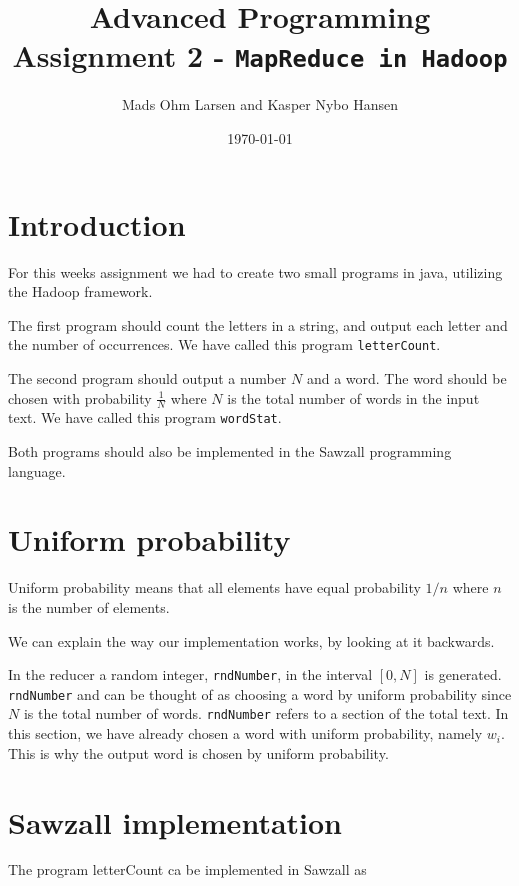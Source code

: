 \documentclass[10pt, a4paper]{article}
\title{Advanced Programming \\\small{Assignment 2} - \texttt{MapReduce in Hadoop}}
\author{Mads Ohm Larsen and Kasper Nybo Hansen}
\date{\today}
\begin{document}
	
\maketitle

\section{Introduction} %
\label{sec:introduction}
For this weeks assignment we had to create two small programs in java, utilizing the Hadoop framework. 

The first program should count the letters in a string, and output each letter and the number of occurrences. We have called this program \texttt{letterCount}.


The second program should output a number $N$ and a word. The word should be chosen with probability $\frac{1}{N}$ where $N$ is the total number of words in the input text. We have called this program \texttt{wordStat}.

Both programs should also be implemented in the Sawzall programming language.

\section{Uniform probability} %
\label{sec:uniform_probability}
Uniform probability means that all elements have equal probability $1/n$ where $n$ is the number of elements.

We can explain the way our implementation works, by looking at it backwards. 

In the reducer a random integer, \texttt{rndNumber}, in the interval $[0,N]$ is generated. \texttt{rndNumber} and can be thought of as choosing a word by uniform probability since $N$ is the total number of words. \texttt{rndNumber} refers to a section of the total text. In this section, we have already chosen a word with uniform probability, namely $w_i$. This is why the output word is chosen by uniform probability.



\section{Sawzall implementation} %
\label{sec:sawzall_implementation}
The program letterCount ca be implemented in Sawzall as


\end{document}
